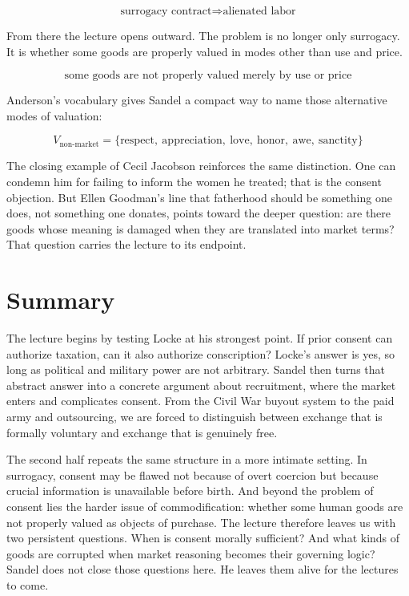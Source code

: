 \begin{equation}
\text{surrogacy contract} \Longrightarrow \text{alienated labor}
\end{equation}

From there the lecture opens outward. The problem is no longer only surrogacy. It is whether some goods are properly valued in modes other than use and price.

\begin{equation}
\text{some goods are not properly valued merely by use or price}
\end{equation}

Anderson's vocabulary gives Sandel a compact way to name those alternative modes of valuation:

\begin{equation}
V_{\text{non-market}}
=
\{\text{respect},\ \text{appreciation},\ \text{love},\ \text{honor},\ \text{awe},\ \text{sanctity}\}
\end{equation}

The closing example of Cecil Jacobson reinforces the same distinction. One can condemn him for failing to inform the women he treated; that is the consent objection. But Ellen Goodman's line that fatherhood should be something one does, not something one donates, points toward the deeper question: are there goods whose meaning is damaged when they are translated into market terms? That question carries the lecture to its endpoint.

\section{Summary}

The lecture begins by testing Locke at his strongest point. If prior consent can authorize taxation, can it also authorize conscription? Locke's answer is yes, so long as political and military power are not arbitrary. Sandel then turns that abstract answer into a concrete argument about recruitment, where the market enters and complicates consent. From the Civil War buyout system to the paid army and outsourcing, we are forced to distinguish between exchange that is formally voluntary and exchange that is genuinely free.

The second half repeats the same structure in a more intimate setting. In surrogacy, consent may be flawed not because of overt coercion but because crucial information is unavailable before birth. And beyond the problem of consent lies the harder issue of commodification: whether some human goods are not properly valued as objects of purchase. The lecture therefore leaves us with two persistent questions. When is consent morally sufficient? And what kinds of goods are corrupted when market reasoning becomes their governing logic? Sandel does not close those questions here. He leaves them alive for the lectures to come.